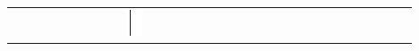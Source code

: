 \documentclass[10pt]{article}
\begin{document}
\begin{center}
\begin{tabular}{|c|c|c|c|c|c|c|c|c|c|c|c|c|c|c|c|c|c|c|c|c|c|c|c|c|c|c|c|c|c|c|}
 &  &  &  &  &  &  &  &  & \includegraphics[max width=\textwidth]{2024_11_21_5229b9d0453456f1828dg-15(1)}

\end{tabular}
\end{center}
\end{document}
